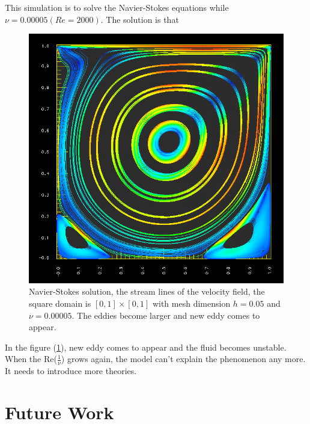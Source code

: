 \documentclass[a4paper]{article}
\begin{document}
This simulation is to solve the Navier-Stokes equations while $\nu=0.00005(Re=2000)$. The solution is that
\begin{figure}[h]
\centering
\includegraphics[scale = 0.5]{images/e.png}
\caption{Navier-Stokes solution, the stream lines of the velocity field, the square domain is $[0, 1] \times [0, 1]$ with mesh dimension $h=0.05$ and $\nu=0.00005$. The eddies become larger and new eddy comes to appear.}
\label{im::d}
\end{figure}


In the figure (\ref{im::d}), new eddy comes to appear and the fluid becomes unstable. When the Re($\frac{1}{\nu}$) grows again, the model can't explain the phenomenon any more. It needs to introduce more theories.
\section{Future Work}
\end{document}
